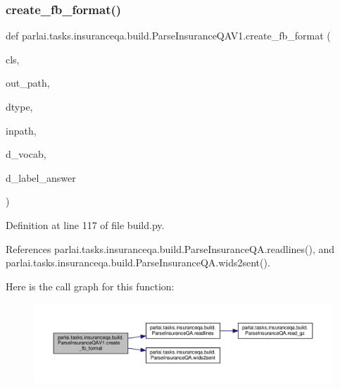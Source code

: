 \subsubsection{\texorpdfstring{create\+\_\+fb\+\_\+format()}{create\_fb\_format()}}
{\footnotesize\ttfamily def parlai.\+tasks.\+insuranceqa.\+build.\+Parse\+Insurance\+Q\+A\+V1.\+create\+\_\+fb\+\_\+format (\begin{DoxyParamCaption}\item[{}]{cls,  }\item[{}]{out\+\_\+path,  }\item[{}]{dtype,  }\item[{}]{inpath,  }\item[{}]{d\+\_\+vocab,  }\item[{}]{d\+\_\+label\+\_\+answer }\end{DoxyParamCaption})}



Definition at line 117 of file build.\+py.



References parlai.\+tasks.\+insuranceqa.\+build.\+Parse\+Insurance\+Q\+A.\+readlines(), and parlai.\+tasks.\+insuranceqa.\+build.\+Parse\+Insurance\+Q\+A.\+wids2sent().

Here is the call graph for this function\+:
\nopagebreak
\begin{figure}[H]
\begin{center}
\leavevmode
\includegraphics[width=350pt]{classparlai_1_1tasks_1_1insuranceqa_1_1build_1_1ParseInsuranceQAV1_a67191000b24f2d3f3be641c5221b9a30_cgraph}
\end{center}
\end{figure}
\mbox{\label{classparlai_1_1tasks_1_1insuranceqa_1_1build_1_1ParseInsuranceQAV1_aec860cdc7404febddbbc3434828c74e3}} 
